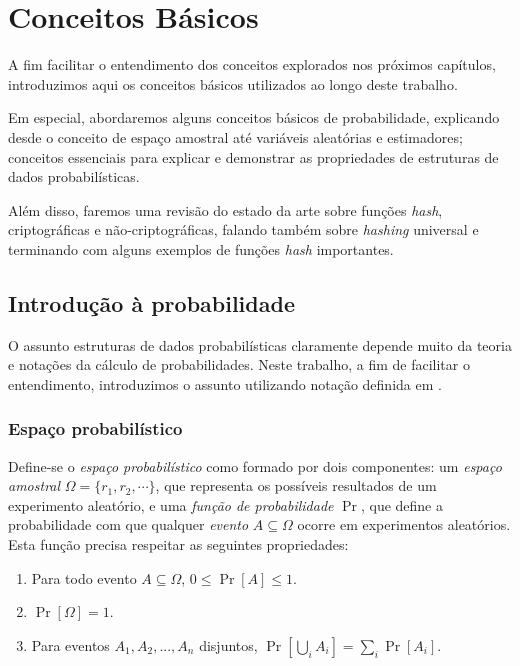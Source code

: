 \chapter{Conceitos Básicos}\label{cap:concepts}

A fim facilitar o entendimento dos conceitos explorados nos próximos capítulos, introduzimos aqui os conceitos básicos utilizados ao longo deste trabalho.

Em especial, abordaremos alguns conceitos básicos de probabilidade, explicando desde o conceito de espaço amostral até variáveis aleatórias e estimadores; conceitos essenciais para explicar e demonstrar as propriedades de estruturas de dados probabilísticas. 

Além disso, faremos uma revisão do estado da arte sobre funções \emph{hash}, criptográficas e não-criptográficas, falando também sobre \emph{hashing} universal e terminando com alguns exemplos de funções \emph{hash} importantes.

\section{Introdução à probabilidade}

O assunto estruturas de dados probabilísticas claramente depende muito da teoria e notações da cálculo de probabilidades. Neste trabalho, a fim de facilitar o entendimento, introduzimos o assunto utilizando notação definida em \cite{figueiredo2007randomizados}.

\subsection{Espaço probabilístico}

Define-se o \emph{espaço probabilístico} como formado por dois componentes: um \emph{espaço amostral} $\Omega = \{r_1, r_2, \cdots\}$, que representa os possíveis resultados de um experimento aleatório, e uma \emph{função de probabilidade} $\Pr$, que define a probabilidade com que qualquer \emph{evento} $A \subseteq \Omega$ ocorre em experimentos aleatórios. Esta função precisa respeitar as seguintes propriedades:

\begin{enumerate}
  \item Para todo evento $A \subseteq \Omega$, $0 \leq \Pr[A] \leq 1$.
  \item $\Pr[\Omega] = 1$.
  \item Para eventos $A_1, A_2, ..., A_n$ disjuntos, $\Pr[\bigcup_i A_i] = \sum_i \Pr[A_i]$.
\end{enumerate}

